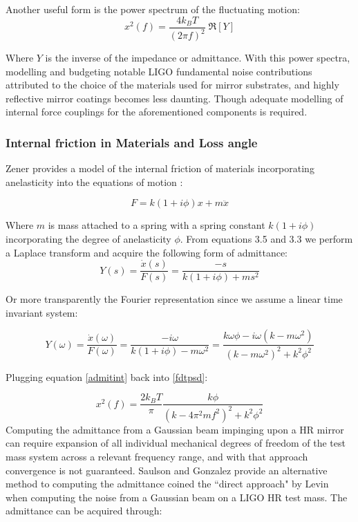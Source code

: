 \noindent Another useful form is the power spectrum of the fluctuating motion:
\begin{equation}\label{fdtpsd}
x^2 (f)  = \frac{4k_B T}{(2 \pi f)^2}\; \Re[Y]
\end{equation}

Where $Y$ is the inverse of the impedance or admittance. With this power spectra, modelling and budgeting notable LIGO fundamental noise contributions attributed to the choice of the materials used for mirror substrates, and highly reflective mirror coatings becomes less daunting. Though adequate modelling of internal force couplings for the aforementioned components is required.

\subsubsection{Internal friction in Materials and Loss angle}

Zener provides a model of the internal friction of materials incorporating anelasticity into the equations of motion \cite{zener:1948}:

\begin{equation}
F = k(1+i\phi)x + m\ddot{x}
\end{equation}

Where $m$ is mass attached to a spring with a spring constant $k(1+ i\phi)$ incorporating the degree of anelasticity $\phi$. From equations 3.5 and 3.3 we perform a Laplace transform and acquire the following form of admittance:
\begin{equation}
Y(s) = \frac{\dot{x}(s)}{F(s)} = \frac{-s}{k(1+i\phi) + ms^2}
\end{equation}

\noindent Or more transparently the Fourier representation since we assume a linear time invariant system:

\begin{equation}\label{admitint}
Y(\omega) = \frac{\dot{x}(\omega)}{F(\omega)} = \frac{-i\omega}{k(1+i\phi) - m\omega^2} = \frac{k \omega \phi - i \omega (k - m \omega^2)}{(k-m\omega^2)^2 +k^2 \phi^2}
\end{equation}

\noindent Plugging equation \ref{admitint} back into \ref{fdtpsd}:

\begin{equation}
x^2 (f)  = \frac{2k_B T}{\pi}\frac{k\phi}{(k-4\pi^2 m f^2)^2 + k^2 \phi^2}
\end{equation}
Computing the admittance from a Gaussian beam impinging upon a HR mirror can require expansion of all individual mechanical degrees of freedom of the test mass system across a relevant frequency range, and with that approach convergence is not guaranteed. Saulson and Gonzalez provide an alternative method to computing the admittance coined the ``direct approach" by Levin when computing the noise from a Gaussian beam on a LIGO HR test mass. The admittance can be acquired through:

